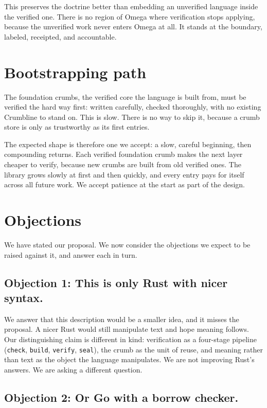 \documentclass[11pt]{article}
\begin{document}
This preserves the doctrine better than embedding an unverified language
inside the verified one. There is no region of Omega where verification
stops applying, because the unverified work never enters Omega at all. It
stands at the boundary, labeled, receipted, and accountable.

\section{Bootstrapping path}

The foundation crumbs, the verified core the language is built from, must
be verified the hard way first: written carefully, checked thoroughly, with
no existing Crumbline to stand on. This is slow. There is no way to skip it,
because a crumb store is only as trustworthy as its first entries.

The expected shape is therefore one we accept: a slow, careful beginning,
then compounding returns. Each verified foundation crumb makes the next
layer cheaper to verify, because new crumbs are built from old verified
ones.
The library grows slowly at first and then quickly, and every entry pays
for itself across all future work. We accept patience at the start as part
of the design.

\section{Objections}

We have stated our proposal. We now consider the objections we expect to
be raised against it, and answer each in turn.

\subsection*{Objection 1: This is only Rust with nicer syntax.}

We answer that this description would be a smaller idea, and it misses the
proposal. A nicer Rust would still manipulate text and hope meaning
follows. Our distinguishing claim is different in kind: verification as a
four-stage pipeline (\texttt{check}, \texttt{build}, \texttt{verify},
\texttt{seal}), the crumb as the unit of reuse, and meaning rather than
text as the object the language manipulates. We are not improving Rust's
answers. We are asking a different question.

\subsection*{Objection 2: Or Go with a borrow checker.}
\end{document}
